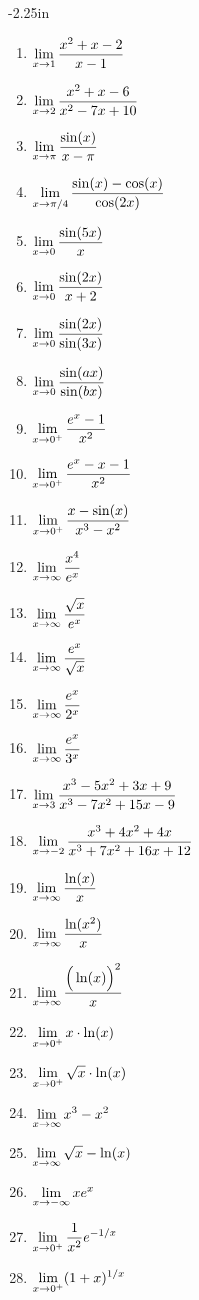 \begin{adjustwidth*}{}{-2.25in}
\begin{multicols*}{2}
\begin{enumerate}[1),resume]
\item {$\displaystyle \lim_{x\to 1} \frac{x^2+x-2}{x-1}$}
\item {$\displaystyle \lim_{x\to 2} \frac{x^2+x-6}{x^2-7x+10}$}
\item {$\displaystyle \lim_{x\to \pi} \frac{\sin (x)}{x-\pi}$}
\item {$\displaystyle \lim_{x\to \pi/4} \frac{\sin (x)-\cos (x)}{\cos (2x)}$}
\item {$\displaystyle \lim_{x\to 0} \frac{\sin (5x)}{x}$}
\item {$\displaystyle \lim_{x\to 0} \frac{\sin (2x)}{x+2}$}
\item {$\displaystyle \lim_{x\to 0} \frac{\sin (2x)}{\sin (3x)}$}
\item {$\displaystyle \lim_{x\to 0} \frac{\sin (ax)}{\sin (bx)}$}
\item {$\displaystyle \lim_{x\to 0^+} \frac{e^x-1}{x^2}$}
\item {$\displaystyle \lim_{x\to 0^+} \frac{e^x-x-1}{x^2}$}
\item {$\displaystyle \lim_{x\to 0^+} \frac{x-\sin (x)}{x^3-x^2}$}
\item {$\displaystyle \lim_{x\to \infty} \frac{x^4}{e^x}$}
\item {$\displaystyle \lim_{x\to \infty} \frac{\sqrt{x}}{e^x}$}
\item {$\displaystyle \lim_{x\to \infty} \frac{e^x}{\sqrt{x}}$}
\item {$\displaystyle \lim_{x\to \infty} \frac{e^x}{2^x}$}
\item {$\displaystyle \lim_{x\to \infty} \frac{e^x}{3^x}$}
\item {$\displaystyle \lim_{x\to 3} \frac{x^3-5x^2+3x+9}{x^3-7x^2+15x-9}$}
\item {$\displaystyle \lim_{x\to -2} \frac{x^3+4x^2+4x}{x^3+7x^2+16x+12}$}
\item {$\displaystyle \lim_{x\to \infty} \frac{\ln (x)}{x}$}
\item {$\displaystyle \lim_{x\to \infty} \frac{\ln (x^2)}{x}$}
\item {$\displaystyle \lim_{x\to \infty} \frac{\Big(\ln (x)\Big)^2}{x}$}
\item {$\displaystyle \lim_{x\to 0^+} x\cdot \ln (x)$}
\item {$\displaystyle \lim_{x\to 0^+} \sqrt{x}\cdot \ln (x)$}
\item {$\displaystyle \lim_{x\to \infty} x^3-x^2$}
\item {$\displaystyle \lim_{x\to \infty} \sqrt{x}-\ln (x)$}
\item {$\displaystyle \lim_{x\to -\infty} xe^x$}
\item {$\displaystyle \lim_{x\to 0^+} \frac{1}{x^2}e^{-1/x}$}
\item {$\displaystyle \lim_{x\to 0^+} (1+x)^{1/x}$}

\end{enumerate}
\end{multicols*}
\end{adjustwidth*}
